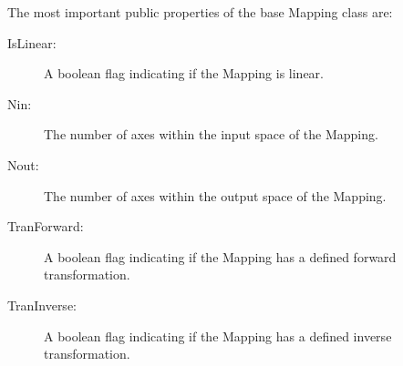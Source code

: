 \documentclass[final,authoryear,5p,times,twocolumn]{elsarticle}
\begin{document}
The most important public properties of the base Mapping class are:
\begin{description}

\item[IsLinear:] A boolean flag indicating if the Mapping is linear.
\item[Nin:] The number of axes within the input space of the Mapping.
\item[Nout:] The number of axes within the output space of the Mapping.
\item[TranForward:] A boolean flag indicating if the Mapping has a defined
forward transformation.
\item[TranInverse:] A boolean flag indicating if the Mapping has a defined
inverse transformation.
\end{description}


\end{document}
